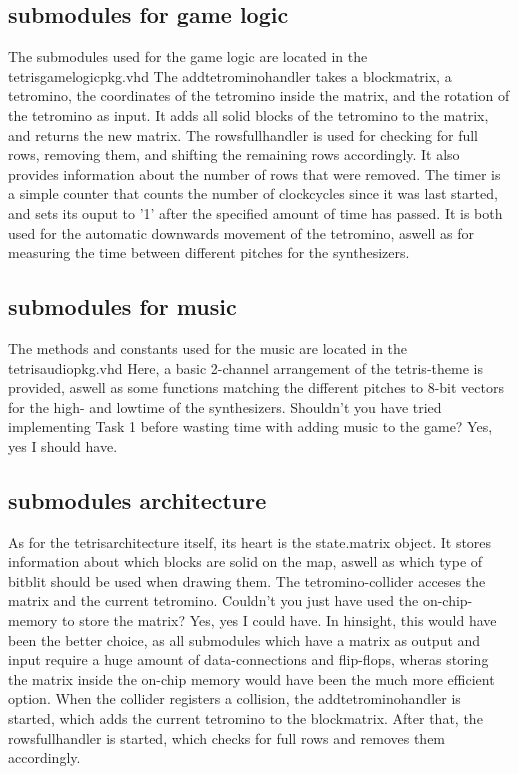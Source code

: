 \documentclass[10pt,a4paper,titlepage,oneside]{article}
\begin{document}
\subsection{submodules for game logic}
The submodules used for the game logic are located in the tetrisgamelogicpkg.vhd
The addtetrominohandler takes a blockmatrix, a tetromino, the coordinates of the tetromino inside the matrix, and the rotation of the tetromino as input.
It adds all solid blocks of the tetromino to the matrix, and returns the new matrix. 
The rowsfullhandler is used for checking for full rows, removing them, and shifting the remaining rows accordingly. It also provides information about the number of rows that were removed.
The timer is a simple counter that counts the number of clockcycles since it was last started, and sets its ouput to '1' after the specified amount of time has passed.
It is both used for the automatic downwards movement of the tetromino, aswell as for measuring the time between different pitches for the synthesizers. 

\subsection{submodules for music}
The methods and constants used for the music are located in the tetrisaudiopkg.vhd
Here, a basic 2-channel arrangement of the tetris-theme is provided, aswell as some functions matching the different pitches to 8-bit vectors for the high- and lowtime of the synthesizers.
Shouldn't you have tried implementing Task 1 before wasting time with adding music to the game? Yes, yes I should have.

\subsection{submodules architecture}
As for the tetrisarchitecture itself, its heart is the state.matrix object.
It stores information about which blocks are solid on the map, aswell as which type of bitblit should be used when drawing them. The tetromino-collider acceses the matrix and 
the current tetromino.
Couldn't you just have used the on-chip-memory to store the matrix? Yes, yes I could have. In hinsight, this would have been the better choice, as all submodules which have a matrix as output and input require 
a huge amount of data-connections and flip-flops, wheras storing the matrix inside the on-chip memory would have been the much more efficient option.
When the collider registers a collision, the addtetrominohandler is started, which adds the current tetromino to the blockmatrix.
After that, the rowsfullhandler is started, which checks for full rows and removes them accordingly. 
\end{document}
